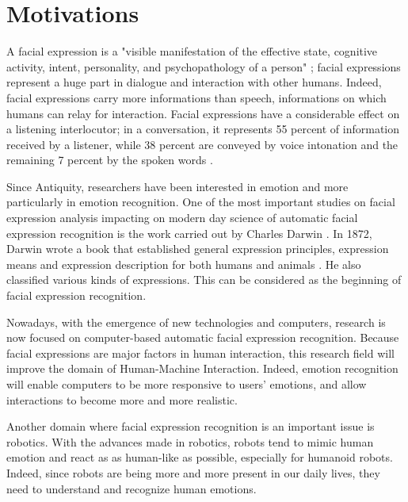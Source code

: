 \chapter{Motivations}

\noindent A facial expression is a "visible manifestation of the effective state, cognitive activity, intent, personality, and psychopathology of a person" \cite{DON99}; facial expressions represent a huge part in dialogue and interaction with other humans. Indeed, facial expressions carry more informations than speech, informations on which humans can relay for interaction. Facial expressions have a considerable effect on a listening interlocutor; in a conversation, it represents 55 percent of information received by a listener, while 38 percent are conveyed by voice intonation and the remaining 7 percent by the spoken words \cite{PAN00}.
\newline

\noindent Since Antiquity, researchers have been interested in emotion and more particularly in emotion recognition. One of the most important studies on facial expression analysis impacting on modern day science of automatic facial expression recognition is the work carried out by Charles Darwin \cite{BET12}. In 1872, Darwin wrote a book that established general expression principles, expression means and expression description for both humans and animals \cite{DAR04}. He also classified various kinds of expressions. This can be considered as the beginning of facial expression recognition.
\newline

\noindent Nowadays, with the emergence of new technologies and computers, research is now focused on computer-based automatic facial expression recognition. Because facial expressions are major factors in human interaction, this research field will improve the domain of Human-Machine Interaction. Indeed, emotion recognition will enable computers to be more responsive to users' emotions, and allow interactions to become more and more realistic. 
\newline

\noindent Another domain where facial expression recognition is an important issue is robotics. With the advances made in robotics, robots tend to mimic human emotion and react as as human-like as possible, especially for humanoid robots. Indeed, since robots are being more and more present in our daily lives, they need to understand and recognize human emotions.
\newline

